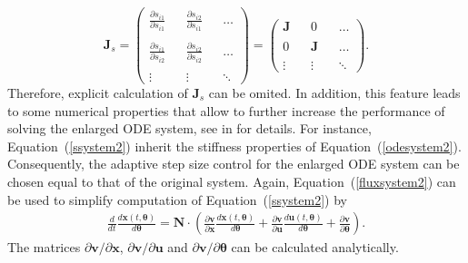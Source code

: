 \documentclass[12pt,a4paper]{scrartcl}
\newcommand{\dd}[2]{\frac{\partial #1}{\partial #2}}
\newcommand{\DD}[2]{\frac{d #1}{d #2}}
\begin{document}
\begin{displaymath}
\mathbf{J}_s = \left( 
\begin{array}{ccccc}
\dd{s_{i1}}{s_{i1}} & & \dd{s_{i2}}{s_{i1}} & & \ldots \\
\\
\dd{s_{i1}}{s_{i2}} & & \dd{s_{i2}}{s_{i2}}& & \ldots \\
\\
\vdots & & \vdots & & \ddots
\end{array} 
\right) = \left( 
\begin{array}{ccccc}
\mathbf{J} & & 0 & & \ldots \\
\\
0 & & \mathbf{J}& & \ldots \\
\\
\vdots & & \vdots & & \ddots
\end{array} 
\right).
\end{displaymath}
Therefore, explicit calculation of $\mathbf{J}_s$ can be omited. In addition, this feature leads to some numerical properties that allow to further increase the performance of solving the enlarged ODE system, see in \cite{Hindmarsh:2005fb} for details. For instance, Equation~(\ref{ssystem2}) inherit the stiffness properties of Equation~(\ref{odesystem2}). Consequently, the adaptive step size control for the enlarged ODE system can be chosen equal to that of the original system. Again, Equation~(\ref{fluxsystem2}) can be used to simplify computation of Equation~(\ref{ssystem2}) by 
\begin{eqnarray}
	\DD{}{t} \DD{\mathbf{x}(t,\boldsymbol{\theta})}{\boldsymbol{\theta}}  =  \mathbf{N}\cdot \left(  \dd{\mathbf{v}}{\mathbf{x}}  \DD{\mathbf{x}(t,\boldsymbol{\theta})}{\boldsymbol{\theta}} +  \dd{\mathbf{v}}{\mathbf{u}}  \DD{\mathbf{u}(t,\boldsymbol{\theta})}{\boldsymbol{\theta}} + \dd{\mathbf{v}}{\boldsymbol{\theta}} \right). \label{ssystemflux}
\end{eqnarray}
The matrices $\partial{\mathbf{v}}/\partial{\mathbf{x}}$, $\partial{\mathbf{v}}/\partial{\mathbf{u}}$ and $\partial{\mathbf{v}}/\partial{\boldsymbol{\theta}}$ can be calculated analytically.

\renewcommand{\bibname}{References}
\renewcommand{\bibfont}{\small}


\end{document}
